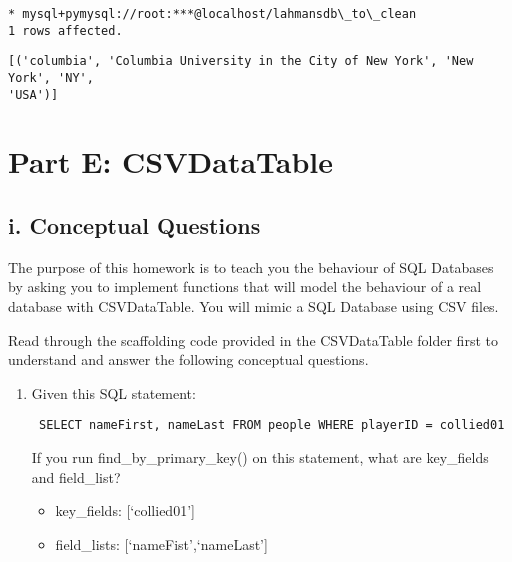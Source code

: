 \documentclass[11pt]{article}
\makeatletter
\providecommand{\tightlist}{%
      \setlength{\itemsep}{0pt}\setlength{\parskip}{0pt}}
\newcommand{\boxspacing}{\kern\kvtcb@left@rule\kern\kvtcb@boxsep}
\newcommand{\prompt}[4]{
        {\ttfamily\llap{{\color{#2}[#3]:\hspace{3pt}#4}}\vspace{-\baselineskip}}
    }
\makeatother
\begin{document}
    \begin{Verbatim}[commandchars=\\\{\}]
 * mysql+pymysql://root:***@localhost/lahmansdb\_to\_clean
1 rows affected.
    \end{Verbatim}

            \begin{tcolorbox}[breakable, size=fbox, boxrule=.5pt, pad at break*=1mm, opacityfill=0]
\prompt{Out}{outcolor}{6}{\boxspacing}
\begin{Verbatim}[commandchars=\\\{\}]
[('columbia', 'Columbia University in the City of New York', 'New York', 'NY',
'USA')]
\end{Verbatim}
\end{tcolorbox}
        
    \hypertarget{part-e-csvdatatable}{%
\section{Part E: CSVDataTable}\label{part-e-csvdatatable}}

\hypertarget{i.-conceptual-questions}{%
\subsection{i. Conceptual Questions}\label{i.-conceptual-questions}}

The purpose of this homework is to teach you the behaviour of SQL
Databases by asking you to implement functions that will model the
behaviour of a real database with CSVDataTable. You will mimic a SQL
Database using CSV files.

Read through the scaffolding code provided in the CSVDataTable folder
first to understand and answer the following conceptual questions.

    \begin{enumerate}
\def\labelenumi{\arabic{enumi}.}
\item
  Given this SQL statement:

\begin{verbatim}
 SELECT nameFirst, nameLast FROM people WHERE playerID = collied01
\end{verbatim}

  If you run find\_by\_primary\_key() on this statement, what are
  key\_fields and field\_list?

  \begin{itemize}
  \tightlist
  \item
    key\_fields: {[}`collied01'{]}
  \item
    field\_lists: {[}`nameFist',`nameLast'{]}
  \end{itemize}
\end{enumerate}
\end{document}
